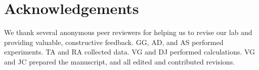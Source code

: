 ﻿\documentclass[reprint,amsmath,amssymb,aps]{revtex4-2}
\begin{document}
\section{Acknowledgements}
We thank several anonymous peer reviewers for helping us to revise our lab and providing valuable, constructive feedback.  GG, AD, and AS performed experiments. TA and RA collected data. VG and DJ performed calculations. VG and JC prepared the manuscript, and all edited and contributed revisions. 
\end{document}
